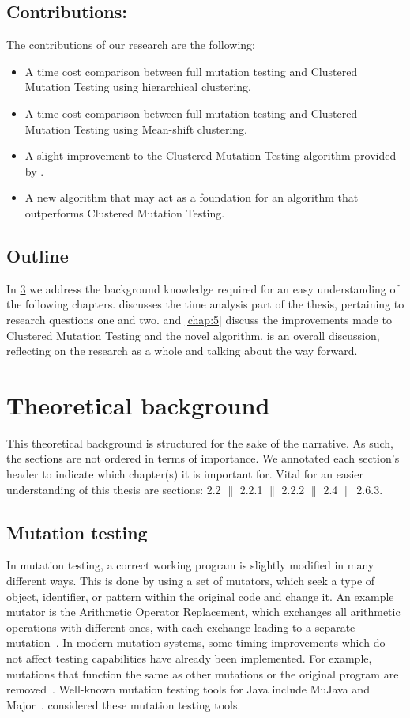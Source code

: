 \documentclass[twoside]{uva-inf-bachelor-thesis}
\begin{document}
\section{Contributions:}
The contributions of our research are the following:
\begin{itemize}
    \item A time cost comparison between full mutation testing and Clustered Mutation Testing using hierarchical clustering.
    \item A time cost comparison between full mutation testing and Clustered Mutation Testing using Mean-shift clustering.
    \item A slight improvement to the Clustered Mutation Testing algorithm provided by \textcite{Basarat21}.
    \item A new algorithm that may act as a foundation for an algorithm that outperforms Clustered Mutation Testing.
\end{itemize}

\section{Outline}
In \cref{chap:2} we address the background knowledge required for an easy understanding of the following chapters.  discusses the time analysis part of the thesis, pertaining to research questions one and two.  and \cref{chap:5} discuss the improvements made to Clustered Mutation Testing and the novel algorithm.
 is an overall discussion, reflecting on the research as a whole and talking about the way forward.

\chapter{Theoretical background}
\label{chap:2}
This theoretical background is structured for the sake of the narrative. As such, the sections are not ordered in terms of importance. We annotated each section's header to indicate which chapter(s) it is important for. Vital for an easier understanding of this thesis are sections: 2.2 $\|$ 2.2.1 $\|$ 2.2.2 $\|$ 2.4 $\|$ 2.6.3.

\section{Mutation testing}
In mutation testing, a correct working program is slightly modified in many different ways. This is done by using a set of mutators, which seek a type of object, identifier, or pattern within the original code and change it. An example mutator is the Arithmetic Operator Replacement, which exchanges all arithmetic operations with different ones, with each exchange leading to a separate mutation~\cite{Mouissie22}. In modern mutation systems, some timing improvements which do not affect testing capabilities have already been implemented. For example, mutations that function the same as other mutations or the original program are removed~\cite{Beller21}. Well-known mutation testing tools for Java include MuJava and Major~\cite{muJava, major}. \textcite{Basarat21} considered these mutation testing tools.
\end{document}

